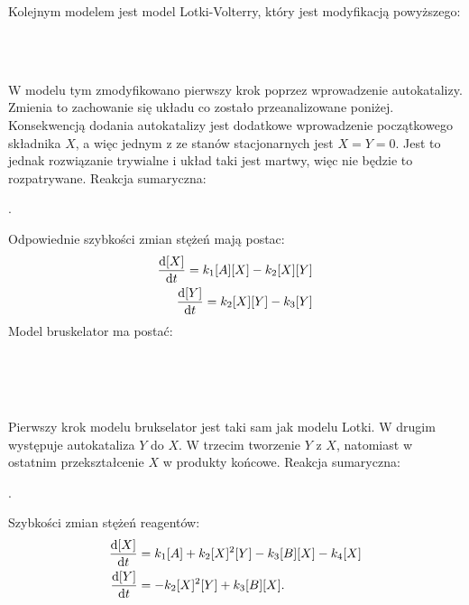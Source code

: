 \documentclass[10pt, a4paper, twoside, onecolumn]{article}
\numberwithin{equation}{section}
\begin{document}
	Kolejnym modelem jest model Lotki-Volterry, który jest modyfikacją powyższego:
	\begin{center}
		 \\
		 \\
	\end{center}
	W modelu tym zmodyfikowano pierwszy krok poprzez wprowadzenie autokatalizy. Zmienia to zachowanie się układu co zostało przeanalizowane poniżej. Konsekwencją dodania autokatalizy jest dodatkowe wprowadzenie początkowego składnika \(X\), a więc jednym z ze stanów stacjonarnych jest \(X=Y=0\). Jest to jednak rozwiązanie trywialne i układ taki jest martwy, więc nie będzie to rozpatrywane. Reakcja sumaryczna:
	\begin{center}
		.
	\end{center}
	Odpowiednie szybkości zmian stężeń mają postac:
	\begin{equation}
	\begin{split}
		\dv{[X]}{t}=k_{1}[A][X]-k_{2}[X][Y] \\
		\dv{[Y]}{t}=k_{2}[X][Y]-k_{3}[Y]
	\end{split}
	\end{equation}
	Model bruskelator ma postać:
	\begin{center}
		 \\
		 \\
		 \\
	\end{center}
	Pierwszy krok modelu brukselator jest taki sam jak modelu Lotki. W drugim występuje autokataliza \(Y\) do \(X\). W trzecim tworzenie \(Y\) z \(X\), natomiast w ostatnim przekształcenie \(X\) w produkty końcowe. Reakcja sumaryczna: 
	\begin{center}
		.
	\end{center}
	Szybkości zmian stężeń reagentów: 
	\begin{equation}\label{bruskelator_pochodne}
	\begin{split}
		\dv{[X]}{t} &= k_{1}[A]+k_{2}[X]^{2}[Y]-k_{3}[B][X]-k_{4}[X] \\
		\dv{[Y]}{t} &= -k_{2}[X]^{2}[Y]+k_{3}[B][X].
	\end{split}
	\end{equation}
	
\end{document}
